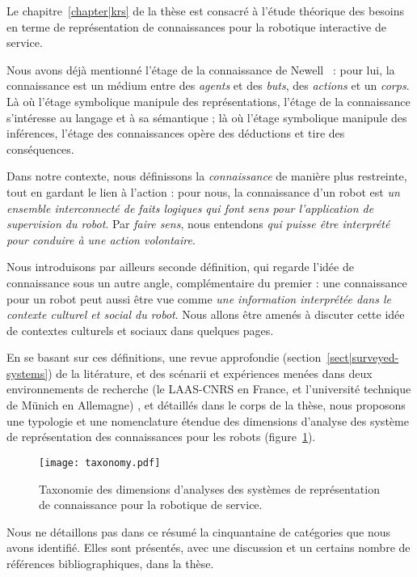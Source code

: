 Le chapitre~\ref{chapter|krs} de la thèse est consacré à l'étude théorique des
besoins en terme de représentation de connaissances pour la robotique
interactive de service.

Nous avons déjà mentionné \og l'étage de la connaissance \fg de
Newell~\cite{Newell1981} : pour lui, la connaissance est un médium entre des
\emph{agents} et des \emph{buts}, des \emph{actions} et un \emph{corps}. Là où
l'étage symbolique manipule des représentations, l'étage de la connaissance
s'intéresse au langage et à sa sémantique ; là où l'étage symbolique manipule
des inférences, l'étage des connaissances opère des déductions et tire des
conséquences.

Dans notre contexte, nous définissons la \emph{connaissance} de manière plus
restreinte, tout en gardant le lien à l'action : pour nous, la connaissance
d'un robot est \emph{un ensemble interconnecté de faits logiques qui font sens
pour l'application de supervision du robot}. Par \emph{faire sens}, nous
entendons \emph{qui puisse être interprété pour conduire à une action
volontaire}.

Nous introduisons par ailleurs seconde définition, qui regarde l'idée de
connaissance sous un autre angle, complémentaire du premier : une connaissance
pour un robot peut aussi être vue comme \emph{une information interprétée dans
le contexte culturel et social du robot}. Nous allons être amenés à discuter
cette idée de contextes culturels et sociaux dans quelques pages.


En se basant sur ces définitions, une revue approfondie
(section~\ref{sect|surveyed-systems}) de la litérature, et des scénarii et
expériences menées dans deux environnements de recherche (le LAAS-CNRS en
France, et l'université technique de Münich en Allemagne) , et détaillés dans
le corps de la thèse, nous proposons une typologie et une nomenclature étendue
des dimensions d'analyse des système de représentation des connaissances pour
les robots (figure~\ref{fig|taxo}).

\begin{figure}
        \centering
        \texttt{[image: taxonomy.pdf]}
        \caption{Taxonomie des dimensions d'analyses des systèmes de 
        représentation de connaissance pour la robotique de service.}
        \label{fig|taxo}
\end{figure}

Nous ne détaillons pas dans ce résumé la cinquantaine de catégories que nous
avons identifié. Elles sont présentés, avec une discussion et un certains
nombre de références bibliographiques, dans la thèse.


